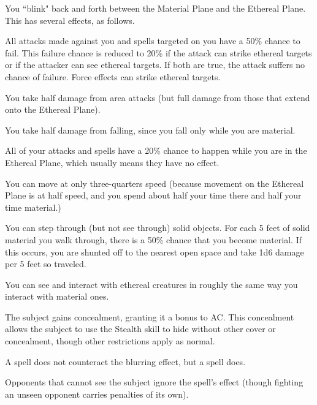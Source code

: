 \spellrng{\rngpers}
\begin{spelleffect}
  You ``blink" back and forth between the Material Plane and the Ethereal Plane. This has several effects, as follows.
  \begin{itemize*}
    \item All attacks made against you and spells targeted on you have a 50\% chance to fail. This failure chance is reduced to 20\% if the attack can strike ethereal targets or if the attacker can see ethereal targets. If both are true, the attack suffers no chance of failure. Force effects can strike ethereal targets.
    \item You take half damage from area attacks (but full damage from those that extend onto the Ethereal Plane).
    \item You take half damage from falling, since you fall only while you are material.
    \item All of your attacks and spells have a 20\% chance to happen while you are in the Ethereal Plane, which usually means they have no effect.
    \item You can move at only three-quarters speed (because movement on the Ethereal Plane is at half speed, and you spend about half your time there and half your time material.)
    \item You can step through (but not see through) solid objects. For each 5 feet of solid material you walk through, there is a 50\% chance that you become material. If this occurs, you are shunted off to the nearest open space and take 1d6 damage per 5 feet so traveled. 
    \item You can see and interact with ethereal creatures in roughly the same way you interact with material ones.
  \end{itemize*}
\end{spelleffect}

\spellrng{\rngclose}
\begin{spelleffect}
  The subject gains concealment, granting it a  bonus to AC. This concealment allows the subject to use the Stealth skill to hide without other cover or concealment, though other restrictions apply as normal.
\end{spelleffect}
\begin{spellnotes}
  A  spell does not counteract the blurring effect, but a  spell does.
  \par Opponents that cannot see the subject ignore the spell's effect (though fighting an unseen opponent carries penalties of its own).
\end{spellnotes}


